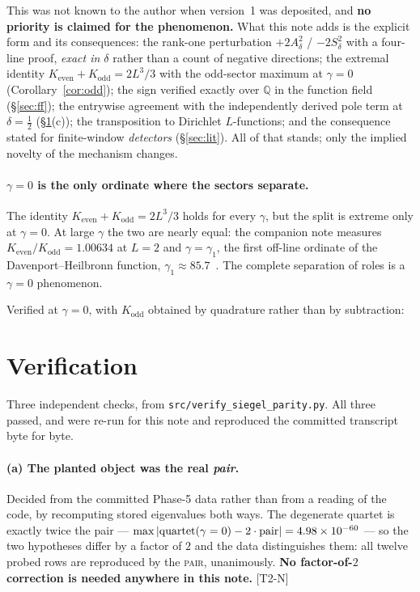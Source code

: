 \documentclass[11pt,a4paper]{article}
\theoremstyle{remark}
\newcommand{\tier}[1]{{\small\textsf{[#1]}}}
\newcommand{\src}[1]{{\footnotesize\texttt{#1}}}
\newcommand{\Ad}{A_\delta}
\newcommand{\Sd}{S_\delta}
\begin{document}
This was not known to the author when version~1 was deposited, and \textbf{no priority is
claimed for the phenomenon.} What this note adds is the explicit form and its consequences:
the rank-one perturbation $+2\Ad^2$ / $-2\Sd^2$ with a four-line proof, \emph{exact in
$\delta$} rather than a count of negative directions; the extremal identity
$K_{\mathrm{even}}+K_{\mathrm{odd}}=2L^3/3$ with the odd-sector maximum at $\gamma=0$
(Corollary~\ref{cor:odd}); the sign verified exactly over $\mathbb Q$ in the function field
(\S\ref{sec:ff}); the entrywise agreement with the independently derived pole term at
$\delta=\tfrac12$ (\S\ref{sec:verif}(c)); the transposition to Dirichlet $L$-functions; and
the consequence stated for finite-window \emph{detectors} (\S\ref{sec:lit}). All of that
stands; only the implied novelty of the mechanism changes.

\paragraph{$\gamma=0$ is the only ordinate where the sectors separate.}
The identity $K_{\mathrm{even}}+K_{\mathrm{odd}}=2L^3/3$ holds for every $\gamma$, but the
split is extreme only at $\gamma=0$. At large $\gamma$ the two are nearly equal: the
companion note measures $K_{\mathrm{even}}/K_{\mathrm{odd}}=1.00634$ at $L=2$ and
$\gamma=\gamma_1$, the first off-line ordinate of the Davenport--Heilbronn function,
$\gamma_1\approx85.7$~\cite[\S6]{DHnote}. The complete separation of roles is a
$\gamma=0$ phenomenon.

Verified at $\gamma=0$, with $K_{\mathrm{odd}}$ obtained by quadrature rather than by
subtraction:



\section{Verification}\label{sec:verif}

Three independent checks, from \src{src/verify\_siegel\_parity.py}. All three passed, and
were re-run for this note and reproduced the committed transcript byte for byte.

\paragraph{(a) The planted object was the real \emph{pair}.} Decided from the committed
Phase-5 data rather than from a reading of the code, by recomputing stored eigenvalues both
ways. The degenerate quartet is exactly twice the pair ---
$\max|{\rm quartet}(\gamma=0)-2\cdot{\rm pair}|=4.98\times10^{-60}$ --- so the two
hypotheses differ by a factor of $2$ and the data distinguishes them: all twelve probed
rows are reproduced by the \textsc{pair}, unanimously. \textbf{No factor-of-$2$ correction
is needed anywhere in this note.} \tier{T2-N}
\end{document}
